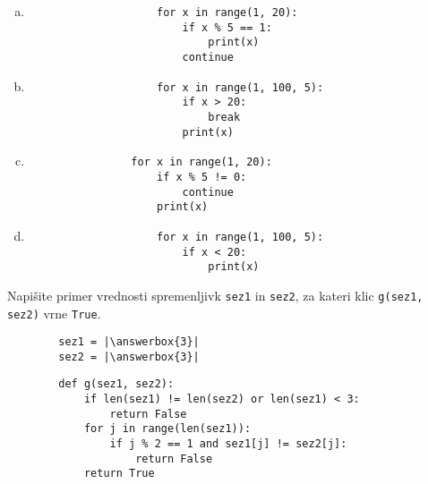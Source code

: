 \documentclass[arhiv, 10pt]{../izpit}
\newcommand{\inlinepy}[1]{\texttt{#1}}
\newcommand{\answerbox}[1]{\framebox{\vphantom{\large M}\hspace{#1cm}}}
\begin{document}
        \begin{multicols}{2}
        \begin{enumerate}[(a)]
\item 
                \begin{verbatim}
                    for x in range(1, 20):
                        if x % 5 == 1:
                            print(x)
                        continue
                \end{verbatim}
            
\item 
                \begin{verbatim}
                    for x in range(1, 100, 5):
                        if x > 20:
                            break
                        print(x)
                \end{verbatim}
            
\item 
            \begin{verbatim}
                for x in range(1, 20):
                    if x % 5 != 0:
                        continue
                    print(x)
            \end{verbatim}
        
\item 
                \begin{verbatim}
                    for x in range(1, 100, 5):
                        if x < 20:
                            print(x)
                \end{verbatim}
            
\end{enumerate}

        \end{multicols}
    
        \naloga*
        \begin{multicols}{2}
        \noindent
        Napišite primer vrednosti spremenljivk \inlinepy{sez1} in \inlinepy{sez2}, za kateri klic \inlinepy{g(sez1, sez2)} vrne \inlinepy{True}.
        \begin{verbatim}
        sez1 = |\answerbox{3}|
        sez2 = |\answerbox{3}|
        \end{verbatim}
        \vfil
        \columnbreak
        \begin{verbatim}
        def g(sez1, sez2):
            if len(sez1) != len(sez2) or len(sez1) < 3:
                return False
            for j in range(len(sez1)):
                if j % 2 == 1 and sez1[j] != sez2[j]:
                    return False
            return True
        \end{verbatim}
        \end{multicols}
    
\end{document}
